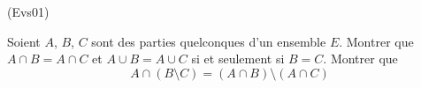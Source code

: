 \begin{tiny}(Evs01)\end{tiny} Soient $A$, $B$, $C$ sont des parties quelconques d'un ensemble $E$.\newline
Montrer que $A\cap B=A\cap C$ et $A\cup B=A\cup C$ si et seulement si
$B=C$. Montrer que
\[A\cap (B\setminus C)=(A\cap B)\setminus (A\cap C)\]